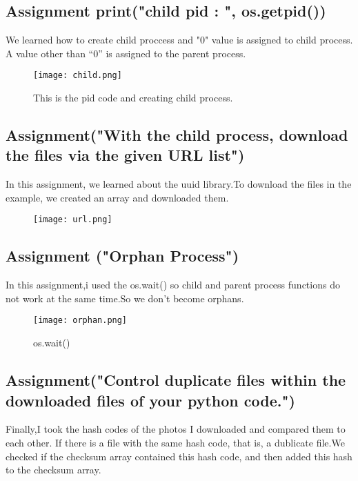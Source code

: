 \documentclass[onecolumn]{article}
\begin{document}
\subsection{Assignment print("child pid : ", os.getpid())}

We learned how to create child proccess and "0" value is assigned to child process. A value other than “0” is assigned to the parent process.

\begin{figure}[h]
\centering
   \texttt{[image: child.png]} 
\caption{\label{fig:demo}
This is the pid code and creating child process.}
\end{figure}

\subsection{Assignment("With the child process, download the files via the given URL list")}
In this assignment, we learned about the uuid library.To download the files in the example, we created an array and downloaded them.

\begin{figure}[h]
\centering
\texttt{[image: url.png]} 
\caption{\label{fig:demo}
}
\end{figure}

\subsection{Assignment ("Orphan Process")}
In this assignment,i used the os.wait() so child and parent process functions do not work at the same time.So we don't become orphans.

\begin{figure}[h]
\centering
    \texttt{[image: orphan.png]} 
\caption{\label{fig:demo}
os.wait()
}
\end{figure}
 
 \subsection{Assignment("Control duplicate files within the downloaded files of your python code.")}
 
 Finally,I took the hash codes of the photos I downloaded and compared them to each other. If there is a file with the same hash code, that is, a dublicate file.We checked if the checksum array contained this hash code, and then added this hash to the checksum array.
\end{document}
